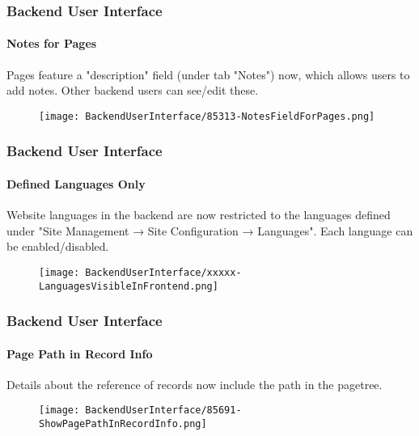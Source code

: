 
\begin{frame}[fragile]
	\frametitle{Backend User Interface}
	\framesubtitle{Notes for Pages}

	Pages feature a "description" field (under tab "Notes") now, which allows
	users to add notes. Other backend users can see/edit these.

	\begin{figure}
		\texttt{[image: BackendUserInterface/85313-NotesFieldForPages.png]}
	\end{figure}

\end{frame}


\begin{frame}[fragile]
	\frametitle{Backend User Interface}
	\framesubtitle{Defined Languages Only}

	Website languages in the backend are now restricted to the languages defined
	under "Site Management → Site Configuration → Languages". Each language can
	be enabled/disabled.

	\begin{figure}
		\texttt{[image: BackendUserInterface/xxxxx-LanguagesVisibleInFrontend.png]}
	\end{figure}

\end{frame}


\begin{frame}[fragile]
	\frametitle{Backend User Interface}
	\framesubtitle{Page Path in Record Info}

	Details about the reference of records now include the path in the pagetree.

	\begin{figure}
		\texttt{[image: BackendUserInterface/85691-ShowPagePathInRecordInfo.png]}
	\end{figure}

\end{frame}


